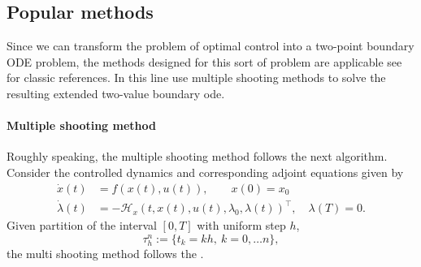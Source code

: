\subsection{Popular methods}
Since we can transform the problem of optimal control into a two-point 
boundary ODE problem, the methods designed for this sort of problem are 
applicable see \cite{Keller1976, Ascher1987, Stoer2013} for classic references. 
In this line \cite{Caetano2001,Yan2008} use multiple shooting methods to 
solve the resulting extended two-value boundary ode.
\paragraph{Multiple shooting method}
Roughly speaking, the multiple shooting method follows the next algorithm.
Consider the controlled dynamics and corresponding adjoint equations given by
\begin{equation}
  \label{eqn:extended_tpvbp}
  \begin{aligned}
    \dot{x}(t) &= 
    f(x(t), u(t)), \qquad x(0)=x_0 \\
    \dot{\lambda}(t) &=
    -\mathcal{H}_x(t,x(t),u(t),\lambda_0,\lambda(t))^\top, \quad 
    \lambda(T)=0.
  \end{aligned}
\end{equation}
Given  partition of the interval $[0, T]$ with uniform step $h$,
$$
\tau_h^n:= \{t_k = kh, \ k=0,\dots n\},
$$
the multi shooting method follows the .
